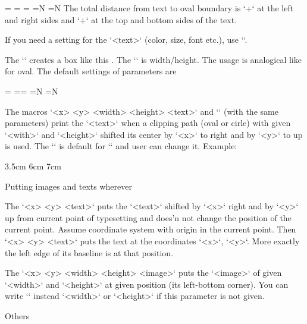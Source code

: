 {\begtt
\ovalparams={\roudness=2pt            %
             \fcolor=\Yellow          %
             \lcolor=\Red             %
             \lwidth=0.5bp            %
             \shadow=N                %
             \overlapmargins=N        %
             \hhkern=0pt \vvkern=0pt} %
\endtt
The total distance from text to oval boundary is `\hhkern+\roudness` at the left and right 
sides and
`\vvkern+\roundness` at the top and bottom sides of the text.

If you need a setting for the `<text>` (color, size, font etc.), use
``.

\new
The `` creates a box like this .
The `\ratio` is width/height. The usage is analogical like for oval. 
The default settings of parameters are

\begtt
\circleparams={ \fcolor=\Yellow \lcolor=\Red \lwidth=0.5bp 
               \shadow=N \ignoremargins=N \hhkern=2pt \vvkern=2pt}
\endtt

\new
The macros `\clipinoval <x> <y> <width> <height> {<text>}`
and `\clipincircle` (with the same parameters)
print the `<text>` when a clipping path (oval or cirle) with given
`<with>` and `<height>` shifted its center by `<x>` to right and by `<y>` to up
is used. 
The `\roundness=5mm` is default for `\clipingoval` and user can change it.
Example:

\begtt 
\clipingcircle 3cm 3.5cm 6cm 7cm {\picw=6cm } 
\endtt

\secc Putting images and texts wherever

\new
The `\puttext <x> <y> {<text>}` puts the `<text>` shifted by `<x>` right and by
`<y>` up from current point of typesetting and does'n not change the
position of the current point. Assume coordinate system with origin in the
current point. Then `\puttext <x> <y> {<text>}` puts the text at the
coordinates `<x>`, `<y>`. More exactly the left edge of its baseline is at that
position. 

\new
The `\putpic <x> <y> <width> <height> {<image>}` puts the `<image>` of given 
`<width>` and `<height>` at given position (its left-bottom corner).
You can write `\nospec` instead `<width>` or `<height>` if this parameter is
not given.

\sec Others

}
